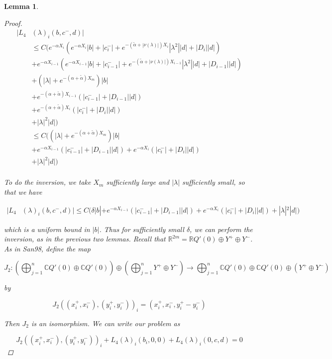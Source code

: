 \documentclass[12pt]{article}
\def\R{{\mathbb R}}
\def\C{{\mathbb C}}
\newtheorem{lemma}{Lemma}
\begin{document}
\begin{lemma}
\begin{proof}
\begin{align*}
|L_4&(\lambda)_i(b, c^-, d)|\\ 
&\leq C \Big( e^{-\alpha X_i} ( e^{-\alpha X_i} |b| + |c_i^-| + e^{-(\tilde{\alpha}+|\nu(\lambda)|) X_i} |\lambda^2| |d| + |D_i||d| ) \\
&+  e^{-\alpha X_{i-1}} ( e^{-\alpha X_{i-1}} |b| + |c_{i-1}^-| + e^{-(\tilde{\alpha}+|\nu(\lambda)|) X_{i-1}} |\lambda^2| |d| + |D_{i-1}||d| ) \\
&+(|\lambda| + e^{-(\alpha + \tilde{\alpha}) X_m})|b| \\
&+ e^{-(\alpha + \tilde{\alpha}) X_{i-1}}( |c_{i-1}^-| + |D_{i-1}||d| ) \\
&+ e^{-(\alpha + \tilde{\alpha}) X_i}( |c_i^-| + |D_i||d| ) \\
&+ |\lambda|^2 |d| \Big) \\
&\leq C \Big( 
(|\lambda| + e^{-(\alpha + \tilde{\alpha}) X_m})|b| \\
&+ e^{-\alpha X_{i-1}}( |c_{i-1}^-| + |D_{i-1}||d| ) 
+ e^{-\alpha X_i}( |c_i^-| + |D_i||d| ) \\
&+ |\lambda|^2 |d| \Big) \\
\end{align*}

To do the inversion, we take $X_m$ sufficiently large and $|\lambda|$ sufficiently small, so that we have

\begin{align*}
|L_4&(\lambda)_i(b, c^-, d)| \leq C \Big( 
\delta |b|
+ e^{-\alpha X_{i-1}}( |c_{i-1}^-| + |D_{i-1}||d| )
+ e^{-\alpha X_i}( |c_i^-| + |D_i||d| )
+ |\lambda|^2 |d| \Big)
\end{align*}

which is a uniform bound in $|b|$. Thus for sufficiently small $\delta$, we can perform the inversion, as in the previous two lemmas. Recall that $\R^{2m} = \R Q'(0) \oplus Y^+ \oplus Y^-$. As in San98, define the map

\[
J_2: \left( \bigoplus_{j=1}^n \C Q'(0) \oplus \C Q'(0) \right) \oplus
\left( \bigoplus_{j=1}^n Y^+ \oplus Y^- \right) 
\rightarrow \bigoplus_{j=1}^n \C Q'(0) \oplus \C Q'(0) \oplus (Y^+ \oplus Y^-)
\]

by 

\[
J_2( (x_i^+, x_i^-),(y_i^+, y_i^-))_i = ( x_i^+, x_i^-, y_i^+ - y_i^- )
\]

Then $J_2$ is an isomorphism. We can write our problem as 

\[
J_2( (x_i^+, x_i^-),(y_i^+, y_i^-))_i 
+ L_4(\lambda)_i(b_i, 0, 0) + L_4(\lambda)_i(0, c, d) = 0
\]


\end{proof}
\end{lemma}
\end{document}
